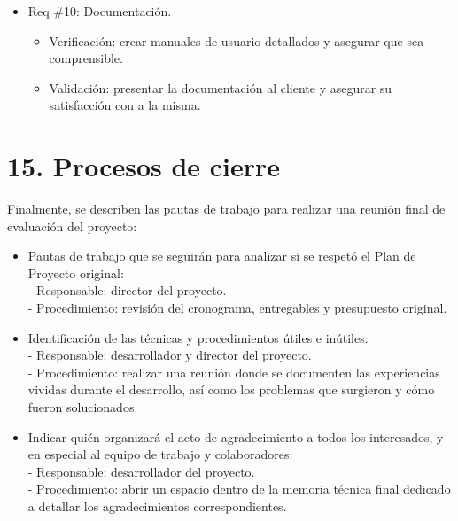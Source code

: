 \documentclass[
11pt, %
]{charter}
\begin{document}
\begin{itemize} 
\item Req \#10: Documentación.
	\begin{itemize}
	\item Verificación: crear manuales de usuario detallados y asegurar que sea comprensible.
	\item Validación: presentar la documentación al cliente y asegurar su satisfacción con a la misma.
	\end{itemize}
\end{itemize}

\section{15. Procesos de cierre}    
\label{sec:cierre}

Finalmente, se describen las pautas de trabajo para realizar una reunión final de evaluación del proyecto:

\begin{itemize}
	\item Pautas de trabajo que se seguirán para analizar si se respetó el Plan de Proyecto original:\\
	 - Responsable: director del proyecto.\\
	 - Procedimiento: revisión del cronograma, entregables y presupuesto original.
	\item Identificación de las técnicas y procedimientos útiles e inútiles:\\
	 - Responsable: desarrollador y director del proyecto.\\
	 - Procedimiento: realizar una reunión donde se documenten las experiencias vividas durante el desarrollo, así como los problemas que surgieron y cómo fueron solucionados.
	\item Indicar quién organizará el acto de agradecimiento a todos los interesados, y en especial al equipo de trabajo y colaboradores:\\
	 - Responsable: desarrollador del proyecto.\\
	 - Procedimiento: abrir un espacio dentro de la memoria técnica final dedicado a detallar los agradecimientos correspondientes.
\end{itemize}
\end{document}
